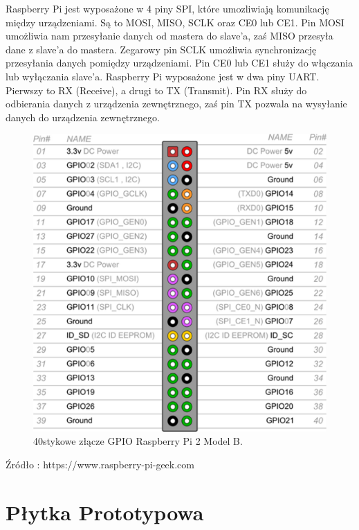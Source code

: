 Raspberry Pi jest wyposażone w 4 piny SPI, które umozliwiają komunikację między urządzeniami. Są to MOSI, MISO, SCLK oraz CE0 lub CE1. Pin MOSI umożliwia nam przesyłanie danych od mastera do slave’a, zaś MISO przesyła dane z slave’a do mastera. Zegarowy pin SCLK umożliwia synchronizację przesyłania danych pomiędzy urządzeniami. Pin CE0 lub CE1 służy do włączania lub wyłączania slave’a. Raspberry Pi wyposażone jest w dwa piny UART. Pierwszy to RX (Receive), a drugi to TX (Transmit). Pin RX służy do odbierania danych z urządzenia zewnętrznego, zaś pin TX pozwala na wysyłanie danych do urządzenia zewnętrznego. 
\newpage
\begin{figure}[htbp]
	\centering
	\includegraphics[width=0.5\linewidth]{"obrazy/GPIO"}
	\caption{40stykowe złącze GPIO Raspberry Pi 2 Model B.}
	\label{fig:2}
\end{figure}

Źródło : https://www.raspberry-pi-geek.com
\\
\section{Płytka Prototypowa}

